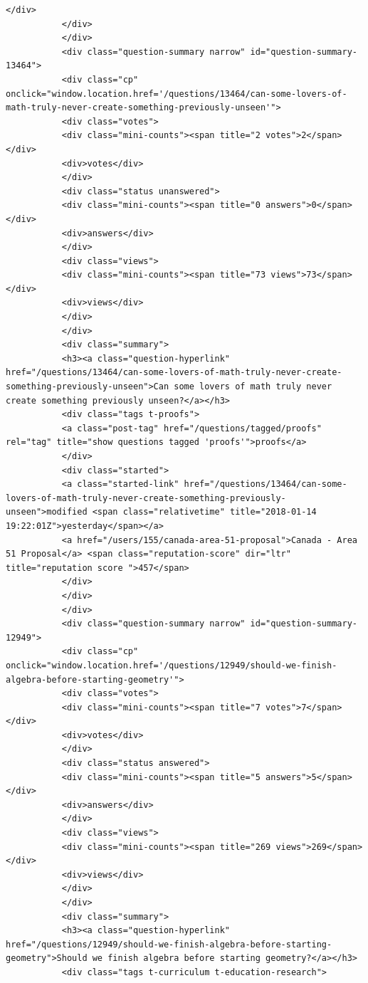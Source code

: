\documentclass[11pt]{article}
\begin{document}
\begin{Verbatim}[commandchars=\\\{\}]
           </div>
           </div>
           </div>
           <div class="question-summary narrow" id="question-summary-13464">
           <div class="cp" onclick="window.location.href='/questions/13464/can-some-lovers-of-math-truly-never-create-something-previously-unseen'">
           <div class="votes">
           <div class="mini-counts"><span title="2 votes">2</span></div>
           <div>votes</div>
           </div>
           <div class="status unanswered">
           <div class="mini-counts"><span title="0 answers">0</span></div>
           <div>answers</div>
           </div>
           <div class="views">
           <div class="mini-counts"><span title="73 views">73</span></div>
           <div>views</div>
           </div>
           </div>
           <div class="summary">
           <h3><a class="question-hyperlink" href="/questions/13464/can-some-lovers-of-math-truly-never-create-something-previously-unseen">Can some lovers of math truly never create something previously unseen?</a></h3>
           <div class="tags t-proofs">
           <a class="post-tag" href="/questions/tagged/proofs" rel="tag" title="show questions tagged 'proofs'">proofs</a>
           </div>
           <div class="started">
           <a class="started-link" href="/questions/13464/can-some-lovers-of-math-truly-never-create-something-previously-unseen">modified <span class="relativetime" title="2018-01-14 19:22:01Z">yesterday</span></a>
           <a href="/users/155/canada-area-51-proposal">Canada - Area 51 Proposal</a> <span class="reputation-score" dir="ltr" title="reputation score ">457</span>
           </div>
           </div>
           </div>
           <div class="question-summary narrow" id="question-summary-12949">
           <div class="cp" onclick="window.location.href='/questions/12949/should-we-finish-algebra-before-starting-geometry'">
           <div class="votes">
           <div class="mini-counts"><span title="7 votes">7</span></div>
           <div>votes</div>
           </div>
           <div class="status answered">
           <div class="mini-counts"><span title="5 answers">5</span></div>
           <div>answers</div>
           </div>
           <div class="views">
           <div class="mini-counts"><span title="269 views">269</span></div>
           <div>views</div>
           </div>
           </div>
           <div class="summary">
           <h3><a class="question-hyperlink" href="/questions/12949/should-we-finish-algebra-before-starting-geometry">Should we finish algebra before starting geometry?</a></h3>
           <div class="tags t-curriculum t-education-research">

\end{Verbatim}
\end{document}
